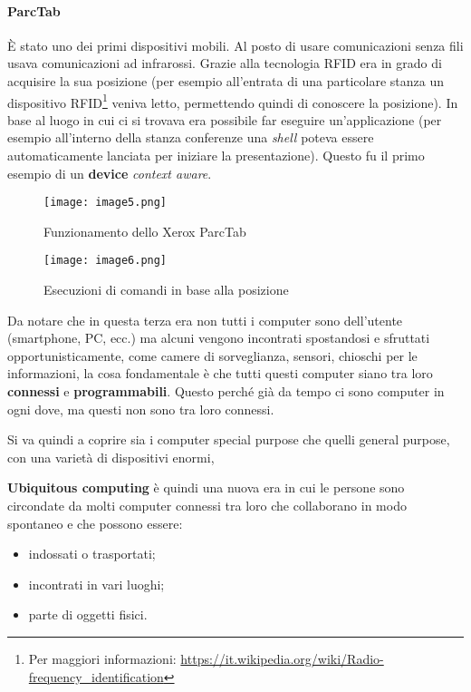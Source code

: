 \paragraph*{ParcTab} \`E stato uno dei primi dispositivi mobili. Al posto di
usare comunicazioni senza fili usava comunicazioni ad infrarossi. Grazie alla
tecnologia RFID era in grado di acquisire la sua posizione (per esempio
all'entrata di una particolare stanza un dispositivo RFID\footnote{Per
maggiori informazioni:
\url{https://it.wikipedia.org/wiki/Radio-frequency_identification}} veniva
letto, permettendo quindi di conoscere la posizione). In base al luogo in cui ci
si trovava era possibile far eseguire un'applicazione (per esempio all'interno
della stanza conferenze una \textit{shell} poteva essere automaticamente
lanciata per iniziare la presentazione). Questo fu il primo esempio di un
\textbf{device} \textit{context aware}.

\begin{figure}[H]
  \texttt{[image: image5.png]}
  \caption{Funzionamento dello Xerox ParcTab}
\endminipage \hspace{75pt}
  \texttt{[image: image6.png]}
  \caption{Esecuzioni di comandi in base alla posizione}
\endminipage
\end{figure}

Da notare che in questa terza era non tutti i computer sono dell'utente
(smartphone, PC, ecc.) ma alcuni vengono incontrati spostandosi e
sfruttati opportunisticamente, come camere di sorveglianza, sensori,
chioschi per le informazioni, la cosa fondamentale è che tutti questi
computer siano tra loro \textbf{connessi} e \textbf{programmabili}.
Questo perché già da tempo ci sono computer in ogni dove, ma questi non
sono tra loro connessi.

Si va quindi a coprire sia i computer special purpose che quelli general
purpose, con una varietà di dispositivi enormi,

\textbf{Ubiquitous computing} è quindi una nuova era in cui le persone
sono circondate da molti computer connessi tra loro che collaborano in
modo spontaneo e che possono essere:

\begin{itemize}
\item indossati o trasportati;
\item incontrati in vari luoghi;
\item parte di oggetti fisici.
\end{itemize}

